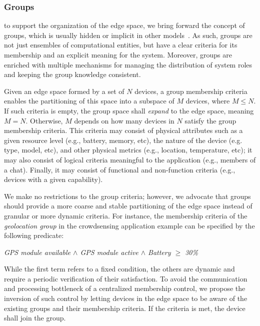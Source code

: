 \subsubsection{Groups} to support the organization of the edge space, we bring forward the concept of groups, which is usually hidden or implicit in other models~\cite{}. As such, groups are not just ensembles of computational entities, but have a clear criteria for its membership and an explicit meaning for the system. Moreover, groups are enriched with multiple mechanisms for managing the distribution of system roles and keeping the group knowledge consistent.

Given an edge space formed by a set of $N$ devices, a group membership criteria enables the partitioning of this space into a subspace of $M$ devices, where $M \leq N$. If such criteria is empty, the group space shall \textit{expand} to the edge space, meaning $M = N$. Otherwise, $M$ depends on how many devices in $N$ satisfy the group membership criteria. This criteria may consist of physical attributes such as a given resource level (e.g., battery, memory, etc), the nature of the device (e.g. type, model, etc), and other physical metrics (e.g., location, temperature, etc); it may also consist of logical criteria meaningful to the application (e.g., members of a chat). Finally, it may consist of functional and non-function criteria (e.g., devices with a given capability). 

We make no restrictions to the group criteria; however, we advocate that groups should provide a more coarse and stable partitioning of the edge space instead of granular or more dynamic criteria. For instance, the membership criteria of the \textit{geolocation group} in the crowdsensing application example can be specified by the following predicate:
\medskip

\begin{center}
	\small
	\textit{GPS module available $\wedge$ GPS module active $\wedge$ Battery $\ge$ 30\%}
\end{center}
\medskip
\normalsize

While the first term refers to a fixed condition, the others are dynamic and require a periodic verification of their satisfaction. To avoid the communication and processing bottleneck of a centralized membership control, we propose the inversion of such control by letting devices in the edge space to be aware of the existing groups and their membership criteria. If the criteria is met, the device shall join the group. 

